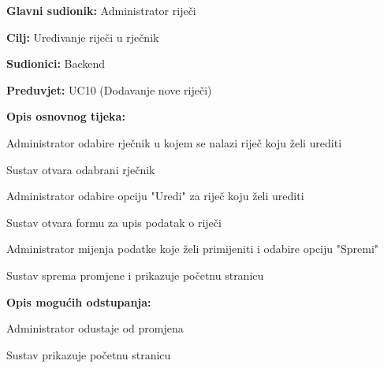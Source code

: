 				
					\noindent {}
				\begin{packed_item}
					
					\item \textbf{Glavni sudionik: } Administrator riječi
					\item  \textbf{Cilj:} Uređivanje riječi u rječnik
					\item  \textbf{Sudionici:} Backend
					\item  \textbf{Preduvjet:} UC10 (Dodavanje nove riječi)
					\item  \textbf{Opis osnovnog tijeka:}
					
					\item[] \begin{packed_enum}
						
						\item Administrator odabire rječnik u kojem se nalazi riječ koju želi urediti
						\item Sustav otvara odabrani rječnik
						\item Administrator odabire opciju "Uredi" za riječ koju želi urediti
						\item Sustav otvara formu za upis podatak o riječi
						\item Administrator mijenja podatke koje želi primijeniti i odabire opciju "Spremi"
						\item Sustav sprema promjene i prikazuje početnu stranicu
					\end{packed_enum}
					
					\item  \textbf{Opis mogućih odstupanja:}
					
					\item[] \begin{packed_item}
						
						\item[5.a] Administrator odustaje od promjena
						\item[] \begin{packed_enum}
							
							\item Sustav prikazuje početnu stranicu
							
						\end{packed_enum}
						
					\end{packed_item}
				\end{packed_item}
				
